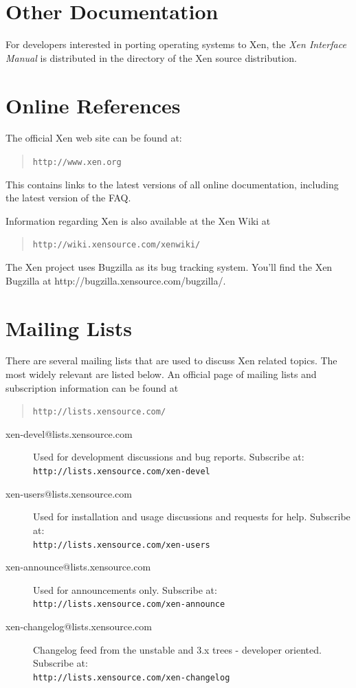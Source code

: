 \documentclass[11pt,twoside,final,openright]{report}
\begin{document}
\section{Other Documentation}

For developers interested in porting operating systems to Xen, the
\emph{Xen Interface Manual} is distributed in the 
directory of the Xen source distribution.


\section{Online References}

The official Xen web site can be found at:
\begin{quote} {\tt http://www.xen.org}
\end{quote}

This contains links to the latest versions of all online
documentation, including the latest version of the FAQ.

Information regarding Xen is also available at the Xen Wiki at
\begin{quote} {\tt http://wiki.xensource.com/xenwiki/}\end{quote}
The Xen project uses Bugzilla as its bug tracking system. You'll find
the Xen Bugzilla at http://bugzilla.xensource.com/bugzilla/.


\section{Mailing Lists}

There are several mailing lists that are used to discuss Xen related
topics. The most widely relevant are listed below. An official page of
mailing lists and subscription information can be found at \begin{quote}
  {\tt http://lists.xensource.com/} \end{quote}

\begin{description}
\item[xen-devel@lists.xensource.com] Used for development
  discussions and bug reports.  Subscribe at: \\
  {\small {\tt http://lists.xensource.com/xen-devel}}
\item[xen-users@lists.xensource.com] Used for installation and usage
  discussions and requests for help.  Subscribe at: \\
  {\small {\tt http://lists.xensource.com/xen-users}}
\item[xen-announce@lists.xensource.com] Used for announcements only.
  Subscribe at: \\
  {\small {\tt http://lists.xensource.com/xen-announce}}
\item[xen-changelog@lists.xensource.com] Changelog feed
  from the unstable and 3.x trees - developer oriented.  Subscribe at: \\
  {\small {\tt http://lists.xensource.com/xen-changelog}}
\end{description}
\end{document}
